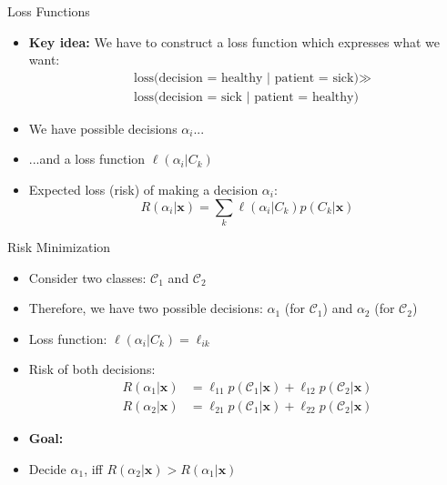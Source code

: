 \begin{frame}{Loss Functions}{}
	\begin{itemize}
		\item \textbf{Key idea:} We have to construct a loss function which expresses what we want:
		\begin{align*}
			&\text{loss(decision = healthy | patient = sick)} \gg \\
			&\text{loss(decision = sick | patient = healthy)}
		\end{align*}
		\item We have possible decisions $\alpha_i$...
		\item ...and a loss function $\ell(\alpha_i \vert C_k)$
		\item Expected loss (risk) of making a decision $\alpha_i$:
		\begin{equation}
			R(\alpha_i \vert \bm{x}) = \sum_k \ell(\alpha_i \vert C_k) p(C_k \vert \bm{x})
		\end{equation}
	\end{itemize}
\end{frame}


\begin{frame}{Risk Minimization}{}
	\begin{itemize}
		\item Consider two classes: $\mathcal{C}_1$ and $\mathcal{C}_2$
		\item Therefore, we have two possible decisions: $\alpha_1$ (for $\mathcal{C}_1$) and $\alpha_2$ (for $\mathcal{C}_2$)
		\item Loss function: $\ell(\alpha_i \vert C_k) = \ell_{ik}$
		\item Risk of both decisions:
		\begin{align*}
			R(\alpha_1 \vert \bm{x}) &= \ell_{11} p(\mathcal{C}_1 \vert \bm{x}) + \ell_{12} p(\mathcal{C}_2 \vert \bm{x}) \\
			R(\alpha_2 \vert \bm{x}) &= \ell_{21} p(\mathcal{C}_1 \vert \bm{x}) + \ell_{22} p(\mathcal{C}_2 \vert \bm{x})
		\end{align*}
		\item \textbf{Goal:} 
		\item Decide $\alpha_1$, iff $R(\alpha_2 \vert \bm{x}) > R(\alpha_1 \vert \bm{x})$
	\end{itemize}
\end{frame}


